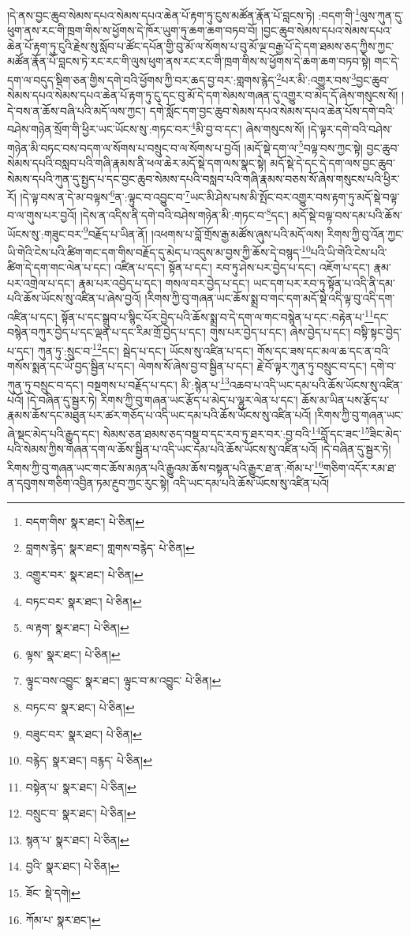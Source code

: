 །དེ་ནས་བྱང་ཆུབ་སེམས་དཔའ་སེམས་དཔའ་ཆེན་པོ་རྟག་ཏུ་ངུས་མཚོན་རྣོན་པོ་བླངས་ཏེ། :བདག་གི་\footnote{བདག་གིས་  སྣར་ཐང་།  པེ་ཅིན། }ལུས་ཀུན་དུ་ཕུག་ནས་རང་གི་ཁྲག་གིས་ས་ཕྱོགས་དེ་ཁོར་ཡུག་ཏུ་ཆག་ཆག་བཏབ་བོ། །བྱང་ཆུབ་སེམས་དཔའ་སེམས་དཔའ་ཆེན་པོ་རྟག་ཏུ་ངུའི་རྗེས་སུ་སློབ་པ་ཚོང་དཔོན་གྱི་བུ་མོ་ལ་སོགས་པ་བུ་མོ་ལྔ་བརྒྱ་པོ་དེ་དག་ཐམས་ཅད་ཀྱིས་ཀྱང་མཚོན་རྣོན་པོ་བླངས་ཏེ་རང་རང་གི་ལུས་ཕུག་ནས་རང་རང་གི་ཁྲག་གིས་ས་ཕྱོགས་དེ་ཆག་ཆག་བཏབ་སྟེ། གང་དེ་དག་ལ་བདུད་སྡིག་ཅན་གྱིས་དགེ་བའི་ཕྱོགས་ཀྱི་བར་ཆད་བྱ་བར་:གླགས་རྙེད་\footnote{བླགས་རྙེད་  སྣར་ཐང་། གླགས་བརྙེད་  པེ་ཅིན། }པར་མི་:འགྱུར་བས་\footnote{འགྱུར་བར་  སྣར་ཐང་།  པེ་ཅིན། }བྱང་ཆུབ་སེམས་དཔའ་སེམས་དཔའ་ཆེན་པོ་རྟག་ཏུ་ངུ་དང་བུ་མོ་དེ་དག་སེམས་གཞན་དུ་འགྱུར་བ་མེད་དོ་ཞེས་གསུངས་སོ། །དེ་བས་ན་ཆོས་བཞི་པའི་མདོ་ལས་ཀྱང་། དགེ་སློང་དག་བྱང་ཆུབ་སེམས་དཔའ་སེམས་དཔའ་ཆེན་པོས་དགེ་བའི་བཤེས་གཉེན་སྲོག་གི་ཕྱིར་ཡང་ཡོངས་སུ་:གཏང་བར་\footnote{བཏང་བར་  སྣར་ཐང་།  པེ་ཅིན། }མི་བྱ་བ་དང་། ཞེས་གསུངས་སོ། །དེ་ལྟར་དགེ་བའི་བཤེས་གཉེན་མི་བཏང་བས་བདག་ལ་སོགས་པ་བསྲུང་བ་ལ་སོགས་པ་བྱའོ། །མདོ་སྡེ་དག་ལ་\footnote{ལ་རྟག་  སྣར་ཐང་།  པེ་ཅིན། }བལྟ་བས་ཀྱང་སྟེ། བྱང་ཆུབ་སེམས་དཔའི་བསླབ་པའི་གཞི་རྣམས་ནི་ཕལ་ཆེར་མདོ་སྡེ་དག་ལས་སྣང་སྟེ། མདོ་སྡེ་དེ་དང་དེ་དག་ལས་བྱང་ཆུབ་སེམས་དཔའི་ཀུན་དུ་སྤྱད་པ་དང་བྱང་ཆུབ་སེམས་དཔའི་བསླབ་པའི་གཞི་རྣམས་བཅས་སོ་ཞེས་གསུངས་པའི་ཕྱིར་རོ། །དེ་ལྟ་བས་ན་དེ་མ་བལྟས་\footnote{ལྟས་  སྣར་ཐང་།  པེ་ཅིན། }ན་:ལྟུང་བ་འབྱུང་བ་\footnote{ལྟུང་བས་འབྱུང་  སྣར་ཐང་། ལྟུང་བ་མ་འབྱུང་  པེ་ཅིན། }ཡང་མི་ཤེས་པས་མི་སྤོང་བར་འགྱུར་བས་རྟག་ཏུ་མདོ་སྡེ་བལྟ་བ་ལ་གུས་པར་བྱའོ། །དེས་ན་འདིས་ནི་དགེ་བའི་བཤེས་གཉེན་མི་:གཏང་བ་\footnote{བཏང་བ་  སྣར་ཐང་།  པེ་ཅིན། }དང་། མདོ་སྡེ་བལྟ་བས་དམ་པའི་ཆོས་ཡོངས་སུ་:གཟུང་བར་\footnote{བཟུང་བར་  སྣར་ཐང་།  པེ་ཅིན། }བརྗོད་པ་ཡིན་ནོ། །འཕགས་པ་བློ་གྲོས་རྒྱ་མཚོས་ཞུས་པའི་མདོ་ལས། རིགས་ཀྱི་བུ་འོན་ཀྱང་ཡི་གེའི་ངེས་པའི་ཚིག་གང་དག་གིས་བརྗོད་དུ་མེད་པ་འདུས་མ་བྱས་ཀྱི་ཆོས་དེ་བསྙད་\footnote{བརྙེད་  སྣར་ཐང་། བརྙད་  པེ་ཅིན། }པའི་ཡི་གེའི་ངེས་པའི་ཚིག་དེ་དག་གང་ལེན་པ་དང་། འཛིན་པ་དང་། སྟོན་པ་དང་། རབ་ཏུ་ཤེས་པར་བྱེད་པ་དང་། འཇོག་པ་དང་། རྣམ་པར་འགྲེལ་པ་དང་། རྣམ་པར་འབྱེད་པ་དང་། གསལ་བར་བྱེད་པ་དང་། ཡང་དག་པར་རབ་ཏུ་སྟོན་པ་འདི་ནི་དམ་པའི་ཆོས་ཡོངས་སུ་འཛིན་པ་ཞེས་བྱའོ། །རིགས་ཀྱི་བུ་གཞན་ཡང་ཆོས་སྨྲ་བ་གང་དག་མདོ་སྡེ་འདི་ལྟ་བུ་འདི་དག་འཛིན་པ་དང་། སྟོན་པ་དང་སྒྲུབ་པ་སྙིང་པོར་བྱེད་པའི་ཆོས་སྨྲ་བ་དེ་དག་ལ་གང་བསྙེན་པ་དང་:བརྟེན་པ་\footnote{བསྟེན་པ་  སྣར་ཐང་།  པེ་ཅིན། }དང་བསྙེན་བཀུར་བྱེད་པ་དང་ལྡན་པ་དང་རིམ་གྲོ་བྱེད་པ་དང་། གུས་པར་བྱེད་པ་དང་། ཞེས་བྱེད་པ་དང་། བསྟི་སྟང་བྱེད་པ་དང་། ཀུན་ཏུ་:སྲུང་བ་\footnote{བསྲུང་བ་  སྣར་ཐང་།  པེ་ཅིན། }དང་། སྦེད་པ་དང་། ཡོངས་སུ་འཛིན་པ་དང་། གོས་དང་ཟས་དང་མལ་ཆ་དང་ན་བའི་གསོས་སྨན་དང་ཡོ་བྱད་སྦྱིན་པ་དང་། ལེགས་སོ་ཞེས་བྱ་བ་སྦྱིན་པ་དང་། རྗེ་བོ་ལྟར་ཀུན་ཏུ་བསྲུང་བ་དང་། དགེ་བ་ཀུན་ཏུ་བསྲུང་བ་དང་། བསྔགས་པ་བརྗོད་པ་དང་། མི་:སྙེན་པ་\footnote{སྙན་པ་  སྣར་ཐང་།  པེ་ཅིན། }འཆབ་པ་འདི་ཡང་དམ་པའི་ཆོས་ཡོངས་སུ་འཛིན་པའོ། །དེ་བཞིན་དུ་སྦྱར་ཏེ། རིགས་ཀྱི་བུ་གཞན་ཡང་རྩོད་པ་མེད་པ་ལྷུར་ལེན་པ་དང་། ཆོས་མ་ཡིན་པས་རྩོད་པ་རྣམས་ཆོས་དང་མཐུན་པར་ཚར་གཅོད་པ་འདི་ཡང་དམ་པའི་ཆོས་ཡོངས་སུ་འཛིན་པའོ། །རིགས་ཀྱི་བུ་གཞན་ཡང་ཞེ་སྡང་མེད་པའི་རྒྱུད་དང་། སེམས་ཅན་ཐམས་ཅད་བསྡུ་བ་དང་རབ་ཏུ་ཐར་བར་:བྱ་བའི་\footnote{བྱའི་  སྣར་ཐང་།  པེ་ཅིན། }བློ་དང་ཟང་\footnote{ཟོང་  སྡེ་དགེ། }ཟིང་མེད་པའི་སེམས་ཀྱིས་གཞན་དག་ལ་ཆོས་སྦྱིན་པ་འདི་ཡང་དམ་པའི་ཆོས་ཡོངས་སུ་འཛིན་པའོ། །དེ་བཞིན་དུ་སྦྱར་ཏེ། རིགས་ཀྱི་བུ་གཞན་ཡང་གང་ཆོས་མཉན་པའི་རྒྱུའམ་ཆོས་བསྟན་པའི་རྒྱུར་ཐ་ན་:གོམ་པ་\footnote{ཀོམ་པ་  སྣར་ཐང་། }གཅིག་འདོར་རམ་ཐ་ན་དབུགས་གཅིག་འབྱིན་ཏམ་རྔུབ་ཀྱང་རུང་སྟེ། འདི་ཡང་དམ་པའི་ཆོས་ཡོངས་སུ་འཛིན་པའོ། 
